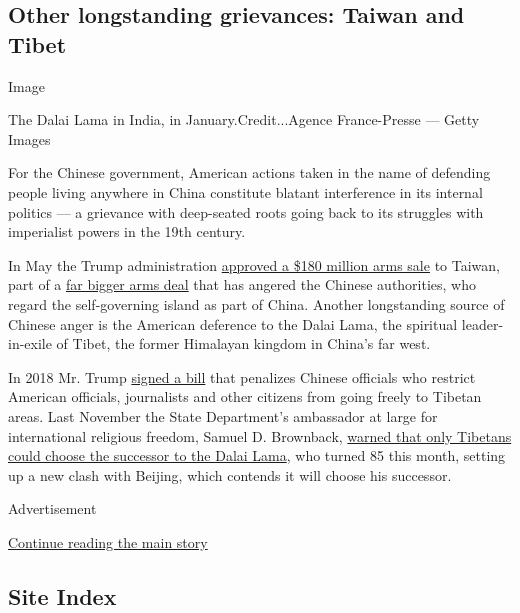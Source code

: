\hypertarget{other-longstanding-grievances-taiwan-and-tibet}{%
\subsection{Other longstanding grievances: Taiwan and
Tibet}\label{other-longstanding-grievances-taiwan-and-tibet}}

Image

The Dalai Lama in India, in January.Credit...Agence France-Presse ---
Getty Images

For the Chinese government, American actions taken in the name of
defending people living anywhere in China constitute blatant
interference in its internal politics --- a grievance with deep-seated
roots going back to its struggles with imperialist powers in the 19th
century.

In May the Trump administration
\href{https://www.cnn.com/2020/05/21/politics/us-taiwan-arms-sale/index.html}{approved
a \$180 million arms sale} to Taiwan, part of a
\href{https://www.nytimes3xbfgragh.onion/2019/06/06/us/politics/trump-taiwan-arms-sale.html?searchResultPosition=1}{far
bigger arms deal} that has angered the Chinese authorities, who regard
the self-governing island as part of China. Another longstanding source
of Chinese anger is the American deference to the Dalai Lama, the
spiritual leader-in-exile of Tibet, the former Himalayan kingdom in
China's far west.

In 2018 Mr. Trump
\href{https://www.nytimes3xbfgragh.onion/2018/12/21/world/asia/trump-china-tibet.html?searchResultPosition=4}{signed
a bill} that penalizes Chinese officials who restrict American
officials, journalists and other citizens from going freely to Tibetan
areas. Last November the State Department's ambassador at large for
international religious freedom, Samuel D. Brownback,
\href{https://www.state.gov/ambassador-at-large-for-international-religious-freedom-samuel-brownback/}{warned
that only Tibetans could choose the successor to the Dalai Lama}, who
turned 85 this month, setting up a new clash with Beijing, which
contends it will choose his successor.

Advertisement

\protect\hyperlink{after-bottom}{Continue reading the main story}

\hypertarget{site-index}{%
\subsection{Site Index}\label{site-index}}


